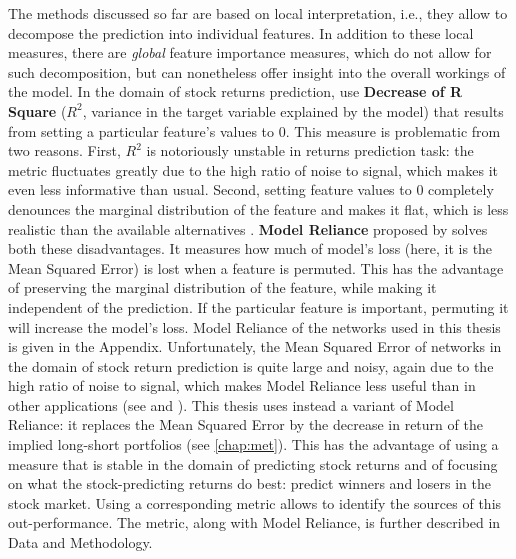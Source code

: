 			The methods discussed so far are based on local interpretation, i.e., they allow to decompose the prediction into individual features. In addition to these local measures, there are \textit{global} feature importance measures, which do not allow for such decomposition, but can nonetheless offer insight into the overall workings of the model. In the domain of stock returns prediction, \cite{gu2020empirical} use \textbf{Decrease of R Square} ($R^2$, variance in the target variable explained by the model) that results from setting a particular feature's values to 0. This measure is problematic from two reasons. First, $R^2$ is notoriously unstable in returns prediction task: the metric fluctuates greatly due to the high ratio of noise to signal, which makes it even less informative than usual. Second, setting feature values to 0 completely denounces the marginal distribution of the feature and makes it flat, which is less realistic than the available alternatives \citep{fisher2019all}. \textbf{Model Reliance} proposed by \citep{fisher2019all} solves both these disadvantages. It measures how much of model's loss (here, it is the Mean Squared Error) is lost when a feature is permuted. This has the advantage of preserving the marginal distribution of the feature, while making it independent of the prediction. If the particular feature is important, permuting it will increase the model's loss. Model Reliance of the networks used in this thesis is given in the Appendix. Unfortunately, the Mean Squared Error of networks in the domain of stock return prediction is quite large and noisy, again due to the high ratio of noise to signal, which makes Model Reliance less useful than in other applications (see \cite{fisher2019all} and \cite{molnar2020interpretable}). This thesis uses instead a variant of Model Reliance: it replaces the Mean Squared Error by the decrease in return of the implied long-short portfolios (see \ref{chap:met}). This has the advantage of using a measure that is stable in the domain of predicting stock returns and of focusing on what the stock-predicting returns do best: predict winners and losers in the stock market. Using a corresponding metric allows to identify the sources of this out-performance. The metric, along with Model Reliance, is further described in Data and Methodology. 		

			
			
		
		 

	

